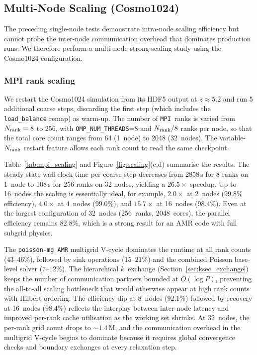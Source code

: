 \documentclass[fleqn,usenatbib]{mnras}
\newcommand{\nrank}{N_{\rm rank}}
\newcommand{\ksec}{\ensuremath{k}\text{-section}}
\newcommand{\code}[1]{\texttt{#1}}
\newcommand{\mpi}[0]{\texttt{MPI}}
\begin{document}
\subsection{Multi-Node Scaling (Cosmo1024)}
\label{sec:perf_multinode}

The preceding single-node tests demonstrate intra-node scaling
efficiency but cannot probe the inter-node communication overhead
that dominates production runs.  We therefore perform a multi-node
strong-scaling study using the Cosmo1024 configuration.

\subsubsection{MPI rank scaling}
\label{sec:perf_mpi_scaling}

We restart the Cosmo1024 simulation from its HDF5 output at
$z \approx 5.2$ and run 5 additional coarse steps, discarding
the first step (which includes the \code{load\_balance} remap) as
warm-up.  The number of \mpi\ ranks is varied from
$\nrank = 8$ to 256, with \code{OMP\_NUM\_THREADS}=8 and
$\nrank/8$ ranks per node, so that the total core count ranges
from 64 (1~node) to 2048 (32~nodes).  The variable-$\nrank$
restart feature allows each rank count to read the same checkpoint.

Table~\ref{tab:mpi_scaling} and Figure~\ref{fig:scaling}(c,d)
summarise the results.  The steady-state wall-clock time per coarse
step decreases from 2858\,s for 8 ranks on 1~node to 108\,s for 256 ranks on 32 nodes, yielding a $26.5\times$ speedup.
Up to 16~nodes the scaling is essentially ideal, for example, $2.0\times$
at 2~nodes ($99.8\%$ efficiency), $4.0\times$ at 4~nodes
($99.0\%$), and $15.7\times$ at 16~nodes ($98.4\%$).  Even at the
largest configuration of 32~nodes (256~ranks, 2048~cores), the
parallel efficiency remains $82.8\%$, which is a strong result for an AMR
code with full subgrid physics.

The \texttt{poisson-mg AMR} multigrid V-cycle dominates the runtime
at all rank counts ($43$--$46\%$), followed by sink operations
($15$--$21\%$) and the combined Poisson base-level solver
($7$--$12\%$).  The hierarchical \ksec\ exchange
(Section~\ref{sec:ksec_exchange}) keeps the number of
communication partners bounded at $O(\log P)$, preventing the
all-to-all scaling bottleneck that would otherwise appear at high
rank counts with Hilbert ordering.  The efficiency dip at 8~nodes
($92.1\%$) followed by recovery at 16~nodes ($98.4\%$) reflects
the interplay between inter-node latency and improved per-rank cache
utilisation as the working set shrinks.  At 32~nodes, the per-rank
grid count drops to ${\sim}1.4\,\mathrm{M}$, and the communication
overhead in the multigrid V-cycle begins to dominate because it requires global convergence
checks and boundary exchanges at every relaxation step.
\end{document}
